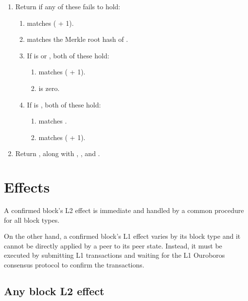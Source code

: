 \documentclass[../hydrozoa.tex]{subfiles}
\begin{document}
\begin{enumerate}
\begin{enumerate}
    \end{enumerate}
  \item Return  if any of these fails to hold:
    \begin{enumerate}
      \item {} matches ( + 1).
      \item {} matches the Merkle root hash of .
      \item If  is  or , both of these hold:
        \begin{enumerate}
          \item {} matches ( + 1).
          \item {} is zero.
        \end{enumerate}
      \item If  is , both of these hold:
        \begin{enumerate}
          \item {} matches .
          \item {} matches ( + 1).
        \end{enumerate}
    \end{enumerate}
  \item Return , along with , , and .
\end{enumerate}

\section{Effects}%
\label{h:l2-block-effect}%

A confirmed block's L2 effect is immediate and handled by a common procedure for all block types.

On the other hand, a confirmed block's L1 effect varies by its block type and it cannot be directly applied by a peer to its peer state.
Instead, it must be executed by submitting L1 transactions and waiting for the L1 Ouroboros consensus protocol to confirm the transactions.

\subsection{Any block L2 effect}%
\label{h:l2-block-effect-l2}%
\end{document}
